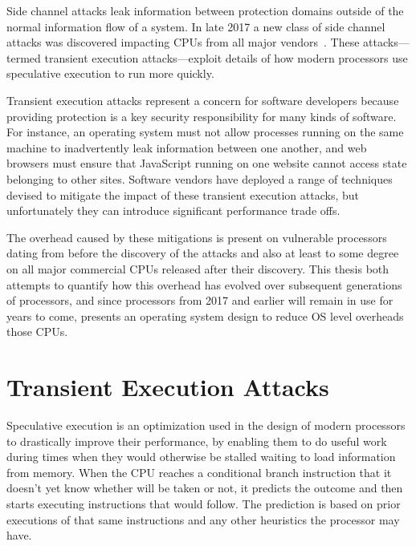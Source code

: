 \noindent
Side channel attacks leak information between protection domains outside of the normal information flow of a system.
In late 2017 a new class of side channel attacks was discovered impacting CPUs from all major vendors~\cite{lipp:meltdown, kocher:spectre}.
These attacks---termed transient execution attacks---exploit details of how modern processors use speculative execution to run more quickly. 

Transient execution attacks represent a concern for software developers because providing protection is a key security responsibility for many kinds of software.
For instance, an operating system must not allow processes running on the same machine to inadvertently leak information between one another, and web browsers must ensure that JavaScript running on one website cannot access state belonging to other sites.
Software vendors have deployed a range of techniques devised to mitigate the impact of these transient execution attacks, but unfortunately they can introduce significant performance trade offs.

The overhead caused by these mitigations is present on vulnerable processors dating from before the discovery of the attacks and also at least to some degree on all major commercial CPUs released after their discovery.
This thesis both attempts to quantify how this overhead has evolved over subsequent generations of processors, and since processors from 2017 and earlier will remain in use for years to come, presents an operating system design to reduce OS level overheads those CPUs.



\section{Transient Execution Attacks}
Speculative execution is an optimization used in the design of modern processors to drastically improve their performance, by enabling them to do useful work during times when they would otherwise be stalled waiting to load information from memory.
When the CPU reaches a conditional branch instruction that it doesn't yet know whether will be taken or not, it predicts the outcome and then starts executing instructions that would follow.
The prediction is based on prior executions of that same instructions and any other heuristics the processor may have.

